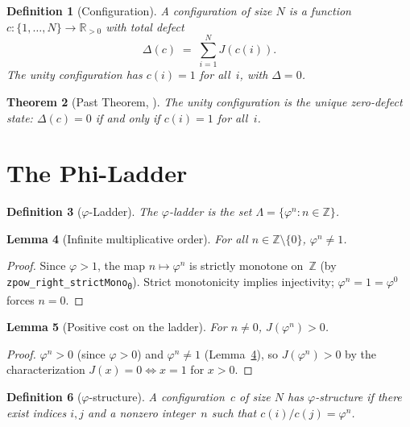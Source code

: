 \documentclass[11pt,a4paper]{article}
\newcommand{\Jcost}{J}
\newcommand{\phirs}{\varphi}
\newtheorem{theorem}{Theorem}[section]
\newtheorem{lemma}[theorem]{Lemma}
\newtheorem{definition}[theorem]{Definition}
\begin{document}
\begin{definition}[Configuration]
A \emph{configuration} of size $N$ is a function $c:\{1,\ldots,N\}\to\mathbb R_{>0}$ with total defect
\[
  \Delta(c) \;=\; \sum_{i=1}^N \Jcost(c(i)).
\]
The \emph{unity configuration} has $c(i)=1$ for all~$i$, with $\Delta=0$.
\end{definition}

\begin{theorem}[Past Theorem, \cite{RS-InitialCondition}]
\label{thm:past}
The unity configuration is the unique zero-defect state:
$\Delta(c)=0$ if and only if $c(i)=1$ for all~$i$.
\end{theorem}

\section{The Phi-Ladder}
\label{sec:ladder}

\begin{definition}[$\phirs$-Ladder]
The \emph{$\phirs$-ladder} is the set $\Lambda=\{\phirs^n:n\in\mathbb Z\}$.
\end{definition}

\begin{lemma}[Infinite multiplicative order]
\label{lem:zpow_ne_one}
For all $n\in\mathbb Z\setminus\{0\}$, $\phirs^n\neq 1$.
\end{lemma}
\begin{proof}
Since $\phirs>1$, the map $n\mapsto\phirs^n$ is strictly monotone on~$\mathbb Z$ (by \texttt{zpow\_right\_strictMono\textsubscript{0}}).  Strict monotonicity implies injectivity; $\phirs^n=1=\phirs^0$ forces $n=0$.
\end{proof}

\begin{lemma}[Positive cost on the ladder]
\label{lem:ladder_cost}
For $n\neq 0$, $\Jcost(\phirs^n)>0$.
\end{lemma}
\begin{proof}
$\phirs^n>0$ (since $\phirs>0$) and $\phirs^n\neq 1$ (Lemma~\ref{lem:zpow_ne_one}), so $\Jcost(\phirs^n)>0$ by the characterization $\Jcost(x)=0\Leftrightarrow x=1$ for $x>0$.
\end{proof}

\begin{definition}[$\phirs$-structure]
A configuration~$c$ of size $N$ has \emph{$\phirs$-structure} if there exist indices $i,j$ and a nonzero integer~$n$ such that $c(i)/c(j)=\phirs^n$.
\end{definition}
\end{document}
